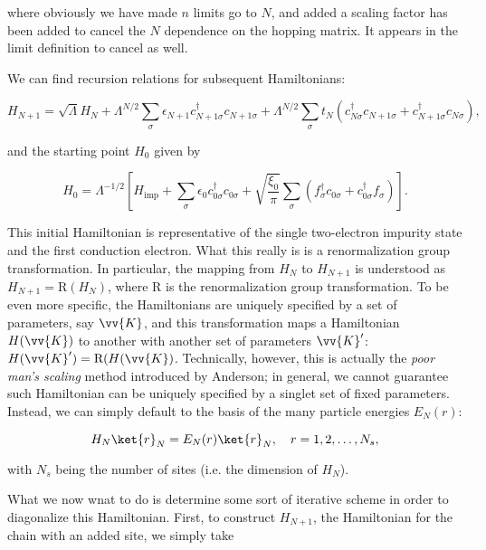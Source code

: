 where obviously we have made $n$ limits go to $N$, and added a scaling factor has been added to cancel the $N$ dependence on the hopping matrix. It appears in the limit definition to cancel as well.

We can find recursion relations for subsequent Hamiltonians:

\begin{equation}
  H_{N+1} = \sqrt{\Lambda}H_N + \Lambda^{N/2}\sum_\sigma \epsilon_{N+1}c^\dagger_{N+1\sigma}c_{N+1\sigma} + \Lambda^{N/2}\sum_\sigma t_N\left( c^\dagger_{N\sigma}c_{N+1\sigma} + c^\dagger_{N+1\sigma}c_{N\sigma} \right),
\end{equation}

and the starting point $H_0$ given by

\begin{equation}
  H_0 = \Lambda^{-1/2} \left[H_{\mathrm{imp}} + \sum_\sigma \epsilon_0 c^\dagger_{0\sigma}c_{0\sigma} + \sqrt{\frac{\xi_0}{\pi}} \sum_\sigma \left( f^\dagger_\sigma c_{0\sigma} + c^\dagger_{0\sigma}f_\sigma \right)\right].
\end{equation}

This initial Hamiltonian is representative of the single two-electron impurity state and the first conduction electron. What this really is is a renormalization group transformation. In particular, the mapping from $H_N$ to $H_{N+1}$ is understood as $H_{N+1} = \mathrm{R}(H_N)$, where $\mathrm{R}$ is the renormalization group transformation. To be even more specific, the Hamiltonians are uniquely specified by a set of parameters, say $\vv{K}$, and this transformation maps a Hamiltonian $H(\vv{K})$ to another with another set of parameters $\vv{K}'$: $H(\vv{K}') = \mathrm{R}(H(\vv{K})$. Technically, however, this is actually the \textit{poor man's scaling} method introduced by Anderson; in general, we cannot guarantee such Hamiltonian can be uniquely specified by a singlet set of fixed parameters. Instead, we can simply default to the basis of the many particle energies $E_N(r)$:

\begin{equation}
  H_N\ket{r}_N = E_N(r)\ket{r}_N, \quad r=1,2,\ldots,N_s,
\end{equation}

with $N_s$ being the number of sites (i.e. the dimension of $H_N$).

What we now wnat to do is determine some sort of iterative scheme in order to diagonalize this Hamiltonian. First, to construct $H_{N+1}$, the Hamiltonian for the chain with an added site, we simply take

